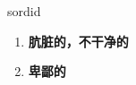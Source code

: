 
\begin{frame}
{\huge sordid}
\begin{center}
\begin{enumerate}\Large
  \item \textbf{肮脏的，不干净的}
  \item \textbf{卑鄙的}
\end{enumerate}
\end{center}
\end{frame}
